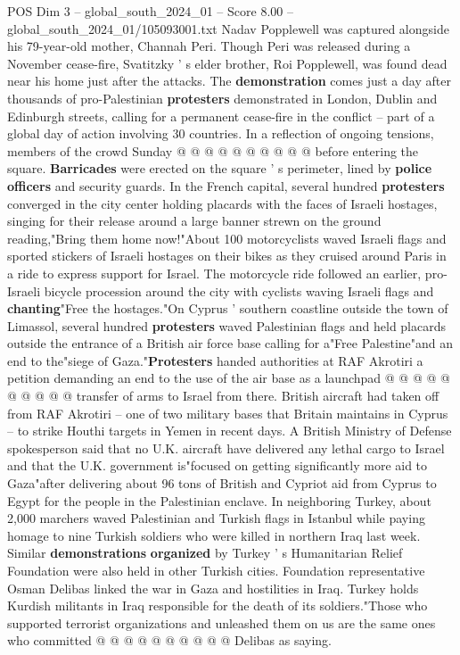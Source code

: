 \begin{textsample}{POS Dim 3 – global\_south\_2024\_01 – Score 8.00 – global\_south\_2024\_01/105093001.txt}
Nadav Popplewell was captured alongside his 79-year-old mother, Channah Peri.
Though Peri was released during a November cease-fire, Svatitzky ' s elder brother, Roi Popplewell, was found dead near his home just after the attacks.
The \textbf{demonstration} comes just a day after thousands of pro-Palestinian \textbf{protesters} demonstrated in London, Dublin and Edinburgh streets, calling for a permanent cease-fire in the conflict -- part of a global day of action involving 30 countries.
In a reflection of ongoing tensions, members of the crowd Sunday @ @ @ @ @ @ @ @ @ @ before entering the square. \textbf{Barricades} were erected on the square ' s perimeter, lined by \textbf{police} \textbf{officers} and security guards.
In the French capital, several hundred \textbf{protesters} converged in the city center holding placards with the faces of Israeli hostages, singing for their release around a large banner strewn on the ground reading,"Bring them home now!"About 100 motorcyclists waved Israeli flags and sported stickers of Israeli hostages on their bikes as they cruised around Paris in a ride to express support for Israel.
The motorcycle ride followed an earlier, pro-Israeli bicycle procession around the city with cyclists waving Israeli flags and \textbf{chanting}"Free the hostages."On Cyprus ' southern coastline outside the town of Limassol, several hundred \textbf{protesters} waved Palestinian flags and held placards outside the entrance of a British air force base calling for a"Free Palestine"and an end to the"siege of Gaza."\textbf{Protesters} handed authorities at RAF Akrotiri a petition demanding an end to the use of the air base as a launchpad @ @ @ @ @ @ @ @ @ @ transfer of arms to Israel from there.
British aircraft had taken off from RAF Akrotiri -- one of two military bases that Britain maintains in Cyprus -- to strike Houthi targets in Yemen in recent days.
A British Ministry of Defense spokesperson said that no U.K. aircraft have delivered any lethal cargo to Israel and that the U.K. government is"focused on getting significantly more aid to Gaza"after delivering about 96 tons of British and Cypriot aid from Cyprus to Egypt for the people in the Palestinian enclave.
In neighboring Turkey, about 2,000 marchers waved Palestinian and Turkish flags in Istanbul while paying homage to nine Turkish soldiers who were killed in northern Iraq last week.
Similar \textbf{demonstrations} \textbf{organized} by Turkey ' s Humanitarian Relief Foundation were also held in other Turkish cities.
Foundation representative Osman Delibas linked the war in Gaza and hostilities in Iraq.
Turkey holds Kurdish militants in Iraq responsible for the death of its soldiers."Those who supported terrorist organizations and unleashed them on us are the same ones who committed @ @ @ @ @ @ @ @ @ @ Delibas as saying.

\end{textsample}
